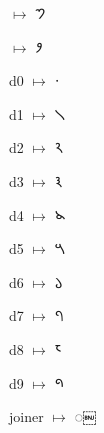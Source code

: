 { $\mapsto$ {\brfont 𑁤}\par
{} $\mapsto$ {\brfont 𑁥}\par
\noindent d0 $\mapsto$ {\brfont 𑁦}\par
\noindent d1 $\mapsto$ {\brfont 𑁧}\par
\noindent d2 $\mapsto$ {\brfont 𑁨}\par
\noindent d3 $\mapsto$ {\brfont 𑁩}\par
\noindent d4 $\mapsto$ {\brfont 𑁪}\par
\noindent d5 $\mapsto$ {\brfont 𑁫}\par
\noindent d6 $\mapsto$ {\brfont 𑁬}\par
\noindent d7 $\mapsto$ {\brfont 𑁭}\par
\noindent d8 $\mapsto$ {\brfont 𑁮}\par
\noindent d9 $\mapsto$ {\brfont 𑁯}\par
\noindent joiner $\mapsto$ {\brfont 𑁿}\par
}

